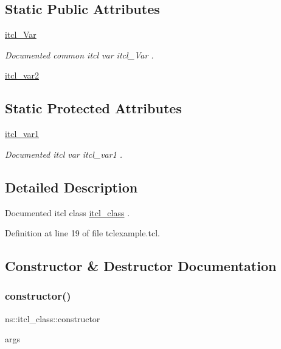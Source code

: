 \subsection*{Static Public Attributes}
\begin{DoxyCompactItemize}
\item 
\mbox{\hyperlink{classns_1_1itcl__class_a8df46696ce554fed04d170932260fbb8}{itcl\+\_\+\+Var}}
\begin{DoxyCompactList}\small\item\em Documented common itcl var {\ttfamily itcl\+\_\+\+Var} . \end{DoxyCompactList}\item 
\mbox{\hyperlink{classns_1_1itcl__class_abaf3c744194c1b3ae68fb0ba70d8786e}{itcl\+\_\+var2}}
\end{DoxyCompactItemize}
\subsection*{Static Protected Attributes}
\begin{DoxyCompactItemize}
\item 
\mbox{\hyperlink{classns_1_1itcl__class_ae515e43ca6bb755d116416f94a13d344}{itcl\+\_\+var1}}
\begin{DoxyCompactList}\small\item\em Documented itcl var {\ttfamily itcl\+\_\+var1} . \end{DoxyCompactList}\end{DoxyCompactItemize}


\subsection{Detailed Description}
Documented itcl class {\ttfamily \mbox{\hyperlink{classns_1_1itcl__class}{itcl\+\_\+class}}} . 

Definition at line 19 of file tclexample.\+tcl.



\subsection{Constructor \& Destructor Documentation}
\mbox{\label{classns_1_1itcl__class_a8ba2ba9d7bcb63b99a765e8f6003134b}} 
\subsubsection{\texorpdfstring{constructor()}{constructor()}}
{\footnotesize\ttfamily ns\+::itcl\+\_\+class\+::constructor\begin{DoxyParamCaption}\item[{}]{args  }\end{DoxyParamCaption}}



